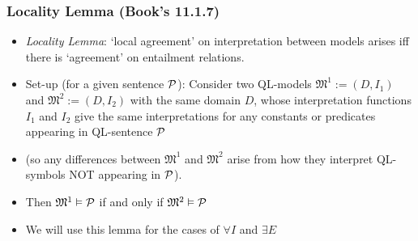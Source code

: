 \begin{frame}
\frametitle{Locality Lemma (Book's 11.1.7)}

\begin{itemize}[<+->]

\item \emph{Locality Lemma}: `local agreement' on interpretation between models arises iff there is `agreement' on entailment relations. 

\item Set-up (for a given sentence $\mathcal{P}$): Consider two QL-models $\mathfrak{M}^1 := (D, I_1)$ and $\mathfrak{M}^2 := (D, I_2)$ with the same domain $D$, whose interpretation functions $I_1$ and $I_2$ give the same interpretations for any constants or predicates appearing in QL-sentence $\mathcal{P}$ 
\item[] (so any differences between $\mathfrak{M}^1$ and $\mathfrak{M}^2$ arise from how they interpret QL-symbols NOT appearing in $\mathcal{P}$). 

\item Then  $\mathfrak{M}^1 \vDash \mathcal{P}$ if and only if $\mathfrak{M}^2 \vDash \mathcal{P}$

\item We will use this lemma for the cases of $\forall I$ and $\exists E$






\end{itemize}
\end{frame}

